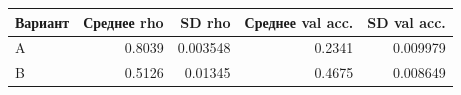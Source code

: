 \begin{tabular}{lrrrr}
\toprule
Вариант & Среднее rho & SD rho & Среднее val acc. & SD val acc. \\
\midrule
A & 0.8039 & 0.003548 & 0.2341 & 0.009979 \\
B & 0.5126 & 0.01345 & 0.4675 & 0.008649 \\
\bottomrule
\end{tabular}